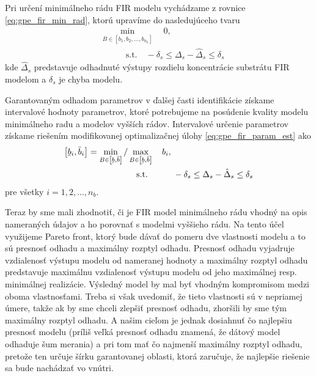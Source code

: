 Pri určení minimálneho rádu FIR modelu vychádzame z rovnice \eqref{eq:gpe_fir_min_rad}, ktorú upravíme do nasledujúceho tvaru
\begin{equation}
	\begin{split}
		& \min_{B \in \left[ b_{1}, b_{2}, \dots, b_{n_b} \right]} \quad 0, \\
		& \qquad \quad \text{s.t.} \quad -\delta_{s} \leq \Delta_{s} - \hat{\Delta}_{s} \leq \delta_{s}
		\end{split}
	\label{eq:fir_min_rad_sub}
\end{equation} 
kde $ \hat{\Delta}_{s} $ predstavuje odhadnuté výstupy rozdielu koncentrácie substrátu FIR modelom a $ \delta_{s} $ je chyba modelu.

Garantovaným odhadom parametrov v ďalšej časti identifikácie získame intervalové hodnoty parametrov, ktoré potrebujeme na posúdenie kvality modelu minimálneho radu a modelov vyšších rádov. Intervalové určenie parametrov získame riešením modifikovanej optimalizačnej úlohy \eqref{eq:gpe_fir_param_est} ako 
\begin{equation}
	\begin{split}
		\left[ \ubar{b}_i, \bar{b}_i \right] = \min_{B \in \left[ \ubar{b}, \bar{b} \right]} / &\max_{B \in \left[ \ubar{b}, \bar{b} \right]} \quad b_i,\\
		& \quad \text{s.t.} \qquad  \quad -\delta_{s} \leq \Delta_{s} - \hat{\Delta}_{s} \leq \delta_{s}
	\end{split}
\label{eq:fir_param_est_sub}
\end{equation}
pre všetky $ i = 1, 2, \dots, n_b $.

Teraz by sme mali zhodnotiť, či je FIR model minimálneho rádu vhodný na opis nameraných údajov a ho porovnať s modelmi vyššieho rádu. Na tento účel využijeme Pareto front, ktorý bude dávať do pomeru dve vlastnosti modelu a to sú presnosť odhadu a maximálny rozptyl odhadu. Presnosť odhadu vyjadruje vzdialenosť výstupu modelu od nameranej hodnoty a maximálny rozptyl odhadu predstavuje maximálnu vzdialenosť výstupu modelu od jeho maximálnej resp. minimálnej realizácie. Výsledný model by mal byť vhodným kompromisom medzi oboma vlastnosťami. Treba si však uvedomiť, že tieto vlastnosti sú v nepriamej úmere, takže ak by sme chceli zlepšiť presnosť odhadu, zhoršili by sme tým maximálny rozptyl odhadu. A našim cieľom je jednak dosiahnuť čo najlepšiu presnosť modelu (príliš veľká presnosť odhadu znamená, že dátový model odhaduje šum merania) a pri tom mať čo najmenší maximálny rozptyl odhadu, pretože ten určuje šírku garantovanej oblasti, ktorá zaručuje, že najlepšie riešenie sa bude nachádzať vo vnútri.

